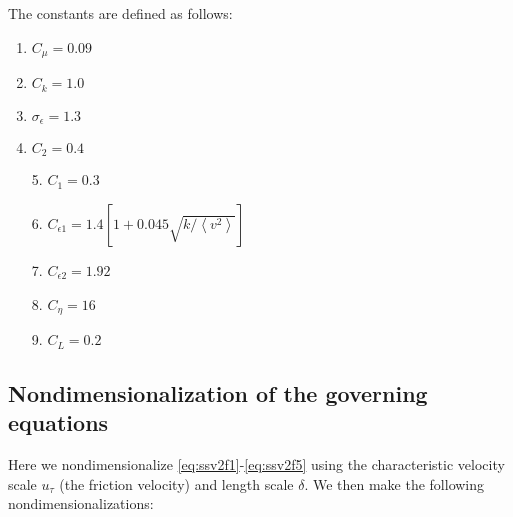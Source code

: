 \documentclass[a4paper,11pt]{article}
\newcommand{\chevron}[1]{\left\langle #1 \right\rangle}
\newcommand{\ep}{\epsilon}
\begin{document}
The constants are defined as follows: 
\begin{multicols}{2}
\begin{enumerate}
	\item $C_\mu = 0.09$
        \item $C_k = 1.0$
	\item $\sigma_\ep = 1.3$
	\item $C_2 = 0.4$	
\end{enumerate}
\columnbreak 

\begin{itemize}
	\item[5.] $C_1 = 0.3$
	\item[6.] $C_{\ep 1} = 1.4[1 + 0.045 \sqrt{k/\chevron{v^2}}]$
	\item[7.] $C_{\ep 2} = 1.92$  
	\item[8.] $C_\eta = 16$
	\item[9.] $C_L = 0.2$
\end{itemize}
\end{multicols}

\subsection{Nondimensionalization of the governing equations}
Here we nondimensionalize \eqref{eq:ssv2f1}-\eqref{eq:ssv2f5} using the characteristic velocity scale $u_{\tau}$ (the friction velocity) and length scale $\delta$. We then make the following nondimensionalizations:
\end{document}
